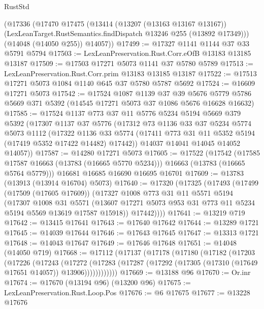 \begin{lexlean}{RustStd}
\begin{coremodule}
    (@17336
      (@17470
        @17475
        (@13414
          (@13207 (@13163 @13167 @13167))
          (LexLeanTarget.RustSemantics.findDispatch @13246 @255 (@13892 @17349)))
        (@14048 (@14050 @255))
        @14057))
@17499 := @17327 @1141 @1144 @37 @33 @5791 @5794
@17503 := LexLeanPreservation.Rust.Corr.eOfB @13183 @13185 @13187
@17509 := @17503 @17271 @5073 @1141 @37 @5780 @5789
@17513 := LexLeanPreservation.Rust.Corr.prim @13183 @13185 @13187
@17522 := @17513 @17271 @5073 @1084 @1140 @645 @37 @5780 @5787 @5692
@17524 := @16609 @17271 @5073
@17542 := @17524
    @1087
    @1139
    @37
    @39
    @5676
    @5779
    @5786
    @5669
    @371
    @5392
    (@14545 @17271 @5073 @37 @1086 @5676 @16628 @16632)
@17585 := @17524
    @1137
    @773
    @37
    @11
    @5776
    @5234
    @5194
    @5669
    @379
    @5392
    (@17307
      @1137
      @37
      @5776
      (@17312
        @73
        @1136
        @33
        @37
        @5234
        @5774
        @5073
        @1112
        (@17322
          @1136
          @33
          @5774
          (@17411 @773 @31 @11 @5352 @5194 (@17419 @5352 @17422 @14482) @17442))
        @14037
        @14041
        @14045
        @14052
        @14057))
@17587 := @14280 @17271 @5073
@17605 := @17522
    (@17542
      (@17585 @17587 @16663 (@13783 (@16665 @5770 @5234)))
      @16663
      (@13783 (@16665 @5764 @5779)))
    @16681
    @16685
    @16690
    @16695
    @16701
@17609 := @13783 (@13913 (@13914 @16704) @5073)
@17640 := @17320
    (@17325
      (@17493
        (@17499
          (@17509 (@17605 @17609))
          (@17327
            @1008
            @773
            @31
            @11
            @5571
            @5194
            (@17307
              @1008
              @31
              @5571
              (@13607 @17271 @5073 @953 @31 @773 @11 @5234 @5194 @5569 @13619 @17587 @15918))
            @17442))))
@17641 := @13219 @719
@17642 := @13415 @17641
@17643 := @17640 @17642
@17644 := @13289 @1721
@17645 := @14039 @17644
@17646 := @17643 @17645
@17647 := @13313 @1721
@17648 := @14043 @17647
@17649 := @17646 @17648
@17651 := @14048 (@14050 @719)
@17668 := @17112
    (@17137
      (@17178
        (@17180
          (@17182
            (@17203
              (@17226
                (@17243
                  (@17272
                    (@17283
                      (@17287 (@17292 (@17305 (@17310 (@17649 @17651 @14057)) @13906))))))))))))
@17669 := @13188 @96
@17670 := Or.inr
@17674 := @17670 (@13194 @96) (@13200 @96)
@17675 := LexLeanPreservation.Rust.Loop.Pos
@17676 := @6 @17675
@17677 := @13228 @17676

\end{coremodule}
\end{lexlean}
